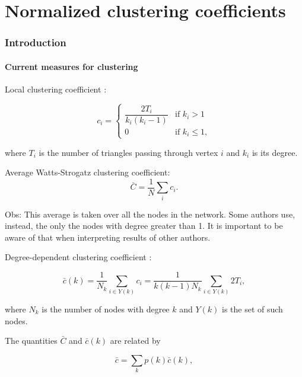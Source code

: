 \documentclass{article}
\begin{document}
\part{Normalized clustering coefficients}


\section{Introduction}

\subsection{Current measures for clustering}

Local clustering coefficient \cite{Watts1998}:

\begin{equation}
    c_i = 
    \left\{
    	\begin{array}{ll}
    		\dfrac{2 T_i}{k_i (k_i-1)}  & \mbox{if } k_i > 1 \\
    		0 & \mbox{if } k_i \leq 1,
    	\end{array}
    \right.
\end{equation}

where $T_i$ is the number of triangles passing through vertex $i$ and $k_i$ is its degree.

Average Watts-Strogatz clustering coefficient:
\begin{equation}
    \bar{C} = \dfrac{1}{N} \sum_i c_i.
\end{equation}

Obs: This average is taken over all the nodes in the network. Some authors use, instead, the only the nodes with degree greater than 1. It is important to be aware of that when interpreting results of other authors.

Degree-dependent clustering coefficient \cite{Vazquez2002Large-scaleInternet}:

\begin{equation}
    \bar{c}(k) = \dfrac{1}{N_k} \sum_{i\in Y(k)} c_i = \dfrac{1}{k(k-1)N_k} \sum_{i\in Y(k)} 2T_i,
\end{equation}

where $N_k$ is the number of nodes with degree $k$ and $Y(k)$ is the set of such nodes.

The quantities $\bar{C}$ and $\bar{c}(k)$ are related by

\begin{equation}
    \bar{c} = \sum_k p(k) \bar{c}(k),
\end{equation}
\end{document}
